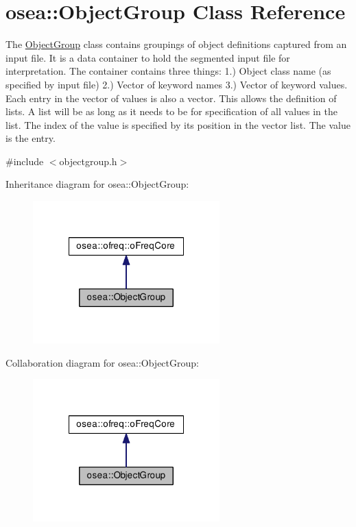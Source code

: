\hypertarget{classosea_1_1_object_group}{\section{osea\-:\-:Object\-Group Class Reference}
\label{classosea_1_1_object_group}
}


The \hyperlink{classosea_1_1_object_group}{Object\-Group} class contains groupings of object definitions captured from an input file. It is a data container to hold the segmented input file for interpretation. The container contains three things\-: 1.) Object class name (as specified by input file) 2.) Vector of keyword names 3.) Vector of keyword values. Each entry in the vector of values is also a vector. This allows the definition of lists. A list will be as long as it needs to be for specification of all values in the list. The index of the value is specified by its position in the vector list. The value is the entry.  




{\ttfamily \#include $<$objectgroup.\-h$>$}



Inheritance diagram for osea\-:\-:Object\-Group\-:
\nopagebreak
\begin{figure}[H]
\begin{center}
\leavevmode
\includegraphics[width=204pt]{classosea_1_1_object_group__inherit__graph}
\end{center}
\end{figure}


Collaboration diagram for osea\-:\-:Object\-Group\-:
\nopagebreak
\begin{figure}[H]
\begin{center}
\leavevmode
\includegraphics[width=204pt]{classosea_1_1_object_group__coll__graph}
\end{center}
\end{figure}
